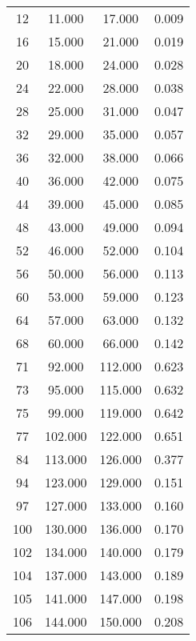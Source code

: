 % 
\begin{tabular}{cccc}
  \hline
  \hline
12 & 11.000 & 17.000 & 0.009 \\ 
  16 & 15.000 & 21.000 & 0.019 \\ 
  20 & 18.000 & 24.000 & 0.028 \\ 
  24 & 22.000 & 28.000 & 0.038 \\ 
  28 & 25.000 & 31.000 & 0.047 \\ 
  32 & 29.000 & 35.000 & 0.057 \\ 
  36 & 32.000 & 38.000 & 0.066 \\ 
  40 & 36.000 & 42.000 & 0.075 \\ 
  44 & 39.000 & 45.000 & 0.085 \\ 
  48 & 43.000 & 49.000 & 0.094 \\ 
  52 & 46.000 & 52.000 & 0.104 \\ 
  56 & 50.000 & 56.000 & 0.113 \\ 
  60 & 53.000 & 59.000 & 0.123 \\ 
  64 & 57.000 & 63.000 & 0.132 \\ 
  68 & 60.000 & 66.000 & 0.142 \\ 
  71 & 92.000 & 112.000 & 0.623 \\ 
  73 & 95.000 & 115.000 & 0.632 \\ 
  75 & 99.000 & 119.000 & 0.642 \\ 
  77 & 102.000 & 122.000 & 0.651 \\ 
  84 & 113.000 & 126.000 & 0.377 \\ 
  94 & 123.000 & 129.000 & 0.151 \\ 
  97 & 127.000 & 133.000 & 0.160 \\ 
  100 & 130.000 & 136.000 & 0.170 \\ 
  102 & 134.000 & 140.000 & 0.179 \\ 
  104 & 137.000 & 143.000 & 0.189 \\ 
  105 & 141.000 & 147.000 & 0.198 \\ 
  106 & 144.000 & 150.000 & 0.208 \\ 
   \hline
\end{tabular}

